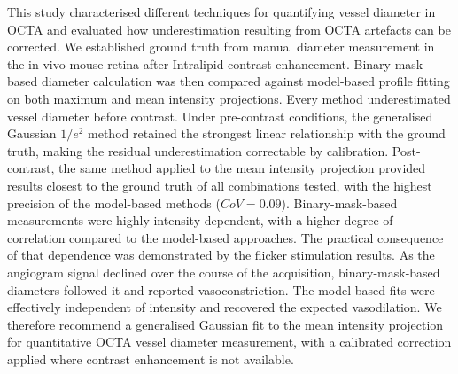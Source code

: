
This study characterised different techniques for quantifying vessel diameter in OCTA and evaluated how underestimation resulting from OCTA artefacts can be corrected. We established ground truth  from manual diameter measurement in the in vivo mouse retina after Intralipid contrast enhancement. Binary-mask-based diameter calculation was then compared against model-based profile fitting on both maximum and mean intensity projections. Every method underestimated vessel diameter before contrast. Under pre-contrast conditions, the generalised Gaussian $1/e^2$ method retained the strongest linear relationship with the ground truth, making the residual underestimation correctable by calibration. Post-contrast, the same method applied to the mean intensity projection provided results closest to the ground truth of all combinations tested, with the highest precision of the model-based methods ($CoV = 0.09$). Binary-mask-based measurements were highly intensity-dependent, with a higher degree of correlation compared to the model-based approaches. The practical consequence of that dependence was demonstrated by the flicker stimulation results. As the angiogram signal declined over the course of the acquisition, binary-mask-based diameters followed it and reported vasoconstriction. The model-based fits were effectively independent of intensity and recovered the expected vasodilation. We therefore recommend a generalised Gaussian fit to the mean intensity projection for quantitative OCTA vessel diameter measurement, with a calibrated correction applied where contrast enhancement is not available.

